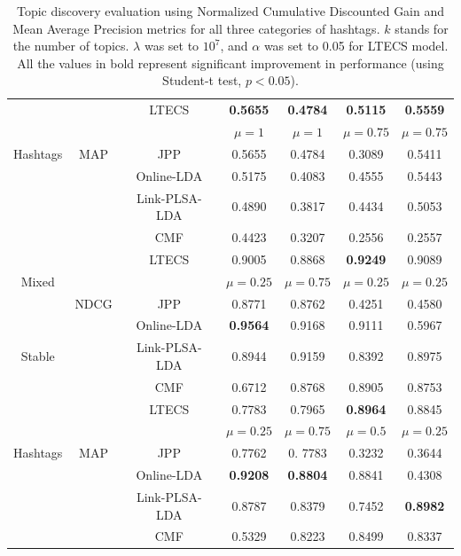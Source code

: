 \begin{table}[!t]
\begin{center}
{{\begin{tabular}{||c|c|c|cccc||}
		& & LTECS & \textbf{0.5655} &  \textbf{0.4784}& \textbf{0.5115} & \textbf{0.5559}  \\
		& &  & $\mu =  1$  & $\mu = 1$ & $\mu =  0.75$ & $\mu = 0.75$\\ \cline{4-7}
Hashtags &MAP & JPP &  0.5655 & 0.4784 & 0.3089 & 0.5411  \\
		& & Online-LDA &  0.5175 & 0.4083 & 0.4555 & 0.5443 \\
		& & Link-PLSA-LDA & 0.4890 & 0.3817  &0.4434 &0.5053  \\
        & & CMF & 0.4423 & 0.3207 & 0.2556 & 0.2557 \\
\hline
	    & & LTECS & 0.9005 & 0.8868& \textbf{0.9249}& 0.9089 \\
Mixed   & &  & $\mu =  0.25$  & $\mu = 0.75$ & $\mu =  0.25 $ & $\mu = 0.25$ \\ \cline{4-7}
		&NDCG & JPP & 0.8771 & 0.8762 & 0.4251 & 0.4580 \\ 
	    & & Online-LDA &\textbf{0.9564} & 0.9168 & 0.9111 & 0.5967 \\
Stable  & & Link-PLSA-LDA & 0.8944 & 0.9159 &0.8392 & 0.8975 \\ 
        & & CMF & 0.6712 & 0.8768 & 0.8905 & 0.8753 \\ \cline{2-7}
		& & LTECS & 0.7783 &0.7965  & \textbf{0.8964} & 0.8845 \\
		& &  & $\mu =  0.25$  & $\mu = 0.75$ & $\mu =  0.5$ & $\mu = 0.25$ \\ \cline{4-7}
Hashtags&MAP & JPP &  0.7762 & 0. 7783 & 0.3232 & 0.3644  \\ 
		& & Online-LDA & \textbf{0.9208}  & \textbf{0.8804} & 0.8841 & 0.4308 \\
		& & Link-PLSA-LDA & 0.8787 & 0.8379  & 0.7452 & \textbf{0.8982} \\
        & & CMF & 0.5329 & 0.8223 & 0.8499 & 0.8337 \\
\hline
\end{tabular}
}
}
\caption[Evaluation of topic discovery]{{Topic discovery evaluation using Normalized Cumulative Discounted Gain and Mean Average Precision metrics
for all three categories of hashtags.  $k$ stands for the number of topics.  $\lambda$ was set to $10^7$, and $\alpha$ was set to 0.05 for LTECS model.
All the values in bold represent significant improvement in performance (using Student-t test, $p < 0.05$).}}
\label{tab:topic_discovery_evaluation}
\end{center}
\end{table}
